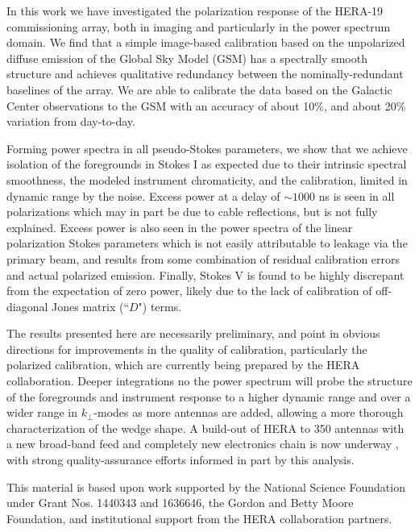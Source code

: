 \documentclass[twocolumn, trackchanges]{aastex61}
\begin{document}
{In this work we have investigated the polarization response of the HERA-19 commissioning array, both in imaging and particularly in the  power spectrum domain.
We find that a simple image-based calibration based on the unpolarized diffuse emission of the Global Sky Model (GSM) has a spectrally smooth structure and achieves qualitative redundancy between the nominally-redundant baselines of the array.  We are able to calibrate the data based on the Galactic Center observations to the GSM with an accuracy of about 10\%, and about 20\% variation from day-to-day.  

Forming power spectra in all pseudo-Stokes parameters, we show that we achieve isolation of the foregrounds in Stokes I as expected due to their intrinsic spectral smoothness, the modeled instrument chromaticity, and the calibration, limited in dynamic range by the noise.  Excess power at a delay of $\sim1000$ ns is seen in all polarizations which may in part be due to cable reflections, but is not fully explained.  
Excess power is also seen in the power spectra of the linear polarization Stokes parameters which is not easily attributable to leakage via the primary beam, and results from some combination of residual calibration errors and actual polarized emission.  
Finally, Stokes V is found to be highly discrepant from the expectation of zero power, likely due to the lack of calibration of off-diagonal Jones matrix (``$D$") terms.

The results presented here are necessarily preliminary, and point in obvious directions for improvements in the quality of calibration, particularly the polarized calibration, which are currently being prepared by the HERA collaboration.  Deeper integrations no the power spectrum will probe the structure of the foregrounds and instrument response to a higher dynamic range and over a wider range in $k_{\perp}$-modes as more antennas are added, allowing a more thorough characterization of the wedge shape.  A build-out of HERA to 350 antennas with a new broad-band feed and completely new electronics chain is now underway \cite{deBoer17}, with strong quality-assurance efforts informed in part by this analysis.  

}

\acknowledgements


This material is based upon work supported by the National Science Foundation under Grant Nos. 1440343 and 1636646, the Gordon and Betty Moore Foundation, and institutional support from the HERA collaboration partners.
\end{document}
